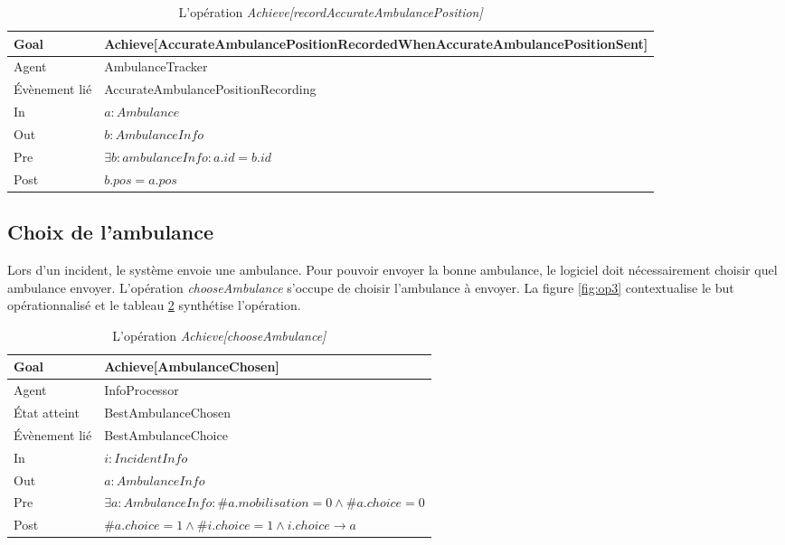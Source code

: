 	\begin{table}[!h] \centering
		\begin{tabularx}{\textwidth}{|l|X|} \hline
			Goal & Achieve[AccurateAmbulance\-Position\-Recorded\-WhenAccurateAmbulance\-PositionSent] \\ \hline
			Agent & AmbulanceTracker \\ \hline
			Évènement lié & AccurateAmbulancePositionRecording \\ \hline
			In & $a: Ambulance$ \\ \hline
			Out & $b: AmbulanceInfo$ \\ \hline
			Pre & $\exists b: ambulanceInfo : a.id = b.id$ \\ \hline
			Post & $b.pos = a.pos$ \\ \hline
		\end{tabularx}
		\caption{L'opération \textit{Achieve[recordAccurateAmbulancePosition]}}\label{tab:op2}
	\end{table}
	
\newpage
\subsection{Choix de l'ambulance}
	
	Lors d'un incident, le système envoie une ambulance. Pour pouvoir envoyer
	la bonne ambulance, le logiciel doit nécessairement choisir quel
	ambulance envoyer. L'opération \textit{chooseAmbulance} s'occupe de choisir
	l'ambulance à envoyer. La figure \ref{fig:op3} contextualise le but
	opérationnalisé et le tableau \ref{tab:op3} synthétise l'opération.
	
	\vfill
	\vfill
	
	\begin{table}[!h] \centering
		\begin{tabularx}{\textwidth}{|l|X|} \hline
			Goal & Achieve[AmbulanceChosen] \\ \hline
			Agent & InfoProcessor \\ \hline
			État atteint & BestAmbulanceChosen \\ \hline
			Évènement lié & BestAmbulanceChoice \\ \hline
			In & $i: IncidentInfo$ \\ \hline
			Out & $a: AmbulanceInfo$ \\ \hline
			Pre & $\exists a: AmbulanceInfo : \#a.mobilisation = 0 \wedge \#a.choice = 0$ \\ \hline
			Post & $\#a.choice = 1 \wedge \#i.choice = 1 \wedge i.choice \rightarrow a$ \\ \hline
		\end{tabularx}
		\caption{L'opération \textit{Achieve[chooseAmbulance]}}\label{tab:op3}
	\end{table}
	
